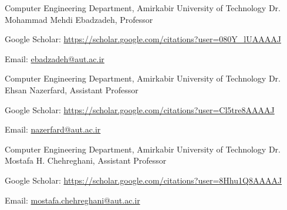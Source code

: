 \begin{cventries}

  \cventry
    {Computer Engineering Department, Amirkabir University of Technology} %
    {Dr. Mohammad Mehdi Ebadzadeh, Professor} %
    {} %
    {} %
    {
      \begin{cvitems} %
        \item {Google Scholar: \href{https://scholar.google.com/citations?user=080Y\_lUAAAAJ&hl=en}{https://scholar.google.com/citations?user=080Y\_lUAAAAJ}}
        \item {Email: \href{mailto:ebadzadeh@aut.ac.ir}{ebadzadeh@aut.ac.ir}}
      \end{cvitems}
    }

  \cventry
    {Computer Engineering Department, Amirkabir University of Technology} %
    {Dr. Ehsan Nazerfard, Assistant Professor} %
    {} %
    {} %
    {
      \begin{cvitems} %
        \item {Google Scholar: \href{https://scholar.google.com/citations?user=Cl5tre8AAAAJ&hl=en}{https://scholar.google.com/citations?user=Cl5tre8AAAAJ}}
        \item {Email: \href{mailto:nazerfard@aut.ac.ir}{nazerfard@aut.ac.ir}}
      \end{cvitems}
    }

  \cventry
    {Computer Engineering Department, Amirkabir University of Technology} %
    {Dr. Mostafa H. Chehreghani, Assistant Professor} %
    {} %
    {} %
    {
      \begin{cvitems} %
        \item {Google Scholar: \href{https://scholar.google.com/citations?user=8Hhu1Q8AAAAJ&hl=en}{https://scholar.google.com/citations?user=8Hhu1Q8AAAAJ}}
        \item {Email: \href{mailto:mostafa.chehreghani@aut.ac.ir}{mostafa.chehreghani@aut.ac.ir}}
      \end{cvitems}
    }


\end{cventries}
